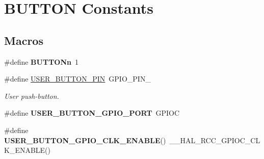 \hypertarget{group___s_t_m32_f0_x_x___n_u_c_l_e_o___b_u_t_t_o_n}{}\section{B\+U\+T\+T\+ON Constants}
\label{group___s_t_m32_f0_x_x___n_u_c_l_e_o___b_u_t_t_o_n}
\subsection*{Macros}
\begin{DoxyCompactItemize}
\item 
\mbox{\label{group___s_t_m32_f0_x_x___n_u_c_l_e_o___b_u_t_t_o_n_ga43d47e509ada64329393005c3be15d64}} 
\#define {\bfseries B\+U\+T\+T\+O\+Nn}~1
\item 
\mbox{\label{group___s_t_m32_f0_x_x___n_u_c_l_e_o___b_u_t_t_o_n_ga34df6915e3013d6a0c74131d3946b659}} 
\#define \hyperlink{group___s_t_m32_f0_x_x___n_u_c_l_e_o___b_u_t_t_o_n_ga34df6915e3013d6a0c74131d3946b659}{U\+S\+E\+R\+\_\+\+B\+U\+T\+T\+O\+N\+\_\+\+P\+IN}~G\+P\+I\+O\+\_\+\+P\+I\+N\+\_
\begin{DoxyCompactList}\small\item\em User push-\/button. \end{DoxyCompactList}\item 
\mbox{\label{group___s_t_m32_f0_x_x___n_u_c_l_e_o___b_u_t_t_o_n_gae2e6fc2fdfda22b4eed3667375a8bd81}} 
\#define {\bfseries U\+S\+E\+R\+\_\+\+B\+U\+T\+T\+O\+N\+\_\+\+G\+P\+I\+O\+\_\+\+P\+O\+RT}~G\+P\+I\+OC
\item 
\mbox{\label{group___s_t_m32_f0_x_x___n_u_c_l_e_o___b_u_t_t_o_n_gaa1f35ca26b42710d057661b54ace7d82}} 
\#define {\bfseries U\+S\+E\+R\+\_\+\+B\+U\+T\+T\+O\+N\+\_\+\+G\+P\+I\+O\+\_\+\+C\+L\+K\+\_\+\+E\+N\+A\+B\+LE}()~\+\_\+\+\_\+\+H\+A\+L\+\_\+\+R\+C\+C\+\_\+\+G\+P\+I\+O\+C\+\_\+\+C\+L\+K\+\_\+\+E\+N\+A\+B\+LE()
\item 
\mbox{\label{group___s_t_m32_f0_x_x___n_u_c_l_e_o___b_u_t_t_o_n_ga71af1d1eec8f8b424b72f625abaad282}} 

\end{DoxyCompactItemize}
